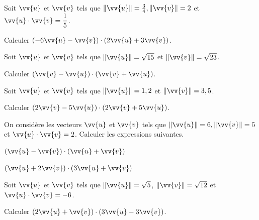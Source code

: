 \documentclass[11pt,a4paper]{article}  %
\begin{document}
\exercice{}

Soit $\vv{u}$ et $\vv{v}$ tels que $\|\vv{u}\|=\frac{3}{4},\|\vv{v}\|=2$ et $\vv{u} \cdot \vv{v}=\dfrac{1}{5}$. 

Calculer $(-6 \vv{u}-\vv{v}) \cdot(2 \vv{u}+3 \vv{v})$.


\exercice{}

Soit $\vv{u}$ et $\vv{v}$ tels que $\|\vv{u}\|=\sqrt{15}$ et $\|\vv{v}\|=\sqrt{23}$. 

Calculer $(\vv{v}-\vv{u}) \cdot(\vv{v}+\vv{u})$.

\exercice{}

Soit $\vv{u}$ et $\vv{v}$ tels que $\|\vv{u}\|=1,2$ et $\|\vv{v}\|=3,5$. 

Calculer $(2 \vv{v}-5 \vv{u}) \cdot(2 \vv{v}+5 \vv{u})$.

\exercice{}

On considère les vecteurs $\vv{u}$ et $\vv{v}$ tels que $\|\vv{u}\|=6,\|\vv{v}\|=5$ et $\vv{u} \cdot \vv{v}=2$. Calculer les expressions suivantes.
\begin{enumMet}
	\item $(\vv{u}-\vv{v}) \cdot(\vv{u}+\vv{v})$
	\item $(\vv{u}+2 \vv{v}) \cdot(3 \vv{u}+\vv{v})$
\end{enumMet}

\exercice{}

Soit $\vv{u}$ et $\vv{v}$ tels que $\|\vv{u}\|=\sqrt{5}$, $\|\vv{v}\|=\sqrt{12}$ et $\vv{u} \cdot \vv{v}=-6$.

Calculer $(2 \vv{u}+\vv{v}) \cdot(3 \vv{u}-3 \vv{v})$.


\exercice{}  \\
\end{document}
